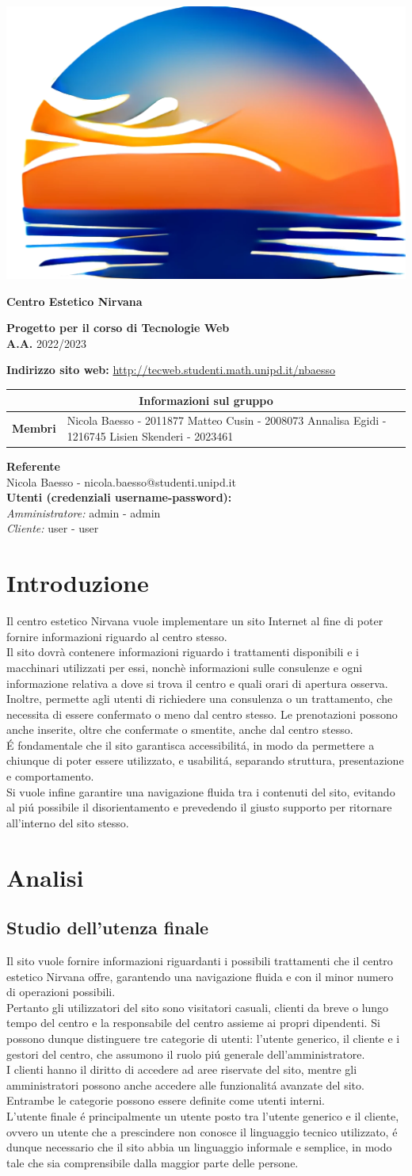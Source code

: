 \documentclass[]{article}
\makeatletter
\newcommand{\copertina}{
	\begin{titlepage}
		\begin{center}
			
			\includegraphics[width=0.4\linewidth]{graphics/icon2.png}\\
			\vspace{1cm}
			
			\begin{Huge}
				\textbf{Centro Estetico Nirvana} \\
			\end{Huge}
			
			\vspace{9pt}  
			
			\begin{large}
				\textbf{Progetto per il corso di Tecnologie Web\\}
				\textbf{A.A.} 2022/2023\\
				\vspace{3pt}
			\end{large}	  
			
			\vspace{24pt}
			
			\begin{large}
				\textbf{Indirizzo sito web:} \href{http://tecweb.studenti.math.unipd.it/nbaesso}{http://tecweb.studenti.math.unipd.it/nbaesso}\\
			\end{large} 
			
			\vspace{10pt} 
			
			\bgroup
			\def\arraystretch{1.3}
			\centering
			\begin{tabular}{r|L{5cm}}
			\multicolumn{2}{c}{\textbf{Informazioni sul gruppo} } \\ \hline
			\textbf{Membri} &  Nicola Baesso - 2011877 \newline Matteo Cusin - 2008073 \newline Annalisa Egidi - 1216745 \newline Lisien Skenderi - 2023461\\
			\end{tabular}
			\egroup
			
			\begin{center}
				\textbf{Referente\\}
				Nicola Baesso - nicola.baesso@studenti.unipd.it\\
				\textbf{Utenti (credenziali username-password):\\}
				\textit{Amministratore:} admin - admin\\
				\textit{Cliente:} user - user\\
			\end{center}
			
		\end{center}
	\end{titlepage}
}	%
\makeatother
\begin{document}
\copertina
\tableofcontents
\newpage
\section{Introduzione}
Il centro estetico Nirvana vuole implementare un sito Internet al fine di poter fornire informazioni riguardo al centro stesso.\\
Il sito dovrà contenere informazioni riguardo i trattamenti disponibili e i macchinari utilizzati per essi, nonchè informazioni sulle consulenze e ogni informazione relativa a dove si trova il centro e quali orari di apertura osserva.\\
Inoltre, permette agli utenti di richiedere una consulenza o un trattamento, che necessita di essere confermato o meno dal centro stesso. Le prenotazioni possono anche inserite, oltre che confermate o smentite, anche dal centro stesso.\\
É fondamentale che il sito garantisca accessibilitá, in modo da permettere a chiunque di poter essere utilizzato, e usabilitá, separando struttura, presentazione e comportamento.\\
Si vuole infine garantire una navigazione fluida tra i contenuti del sito, evitando al piú possibile il disorientamento e prevedendo il giusto supporto per ritornare all'interno del sito stesso.\\
\section{Analisi}
\subsection{Studio dell'utenza finale}
\label{analisi:utenza}
Il sito vuole fornire informazioni riguardanti i possibili trattamenti che il centro estetico Nirvana offre, garantendo una navigazione fluida e con il minor numero di operazioni possibili.\\
Pertanto gli utilizzatori del sito sono visitatori casuali, clienti da breve o lungo tempo del centro e la responsabile del centro assieme ai propri dipendenti.
Si possono dunque distinguere tre categorie di utenti: l'utente generico, il cliente e i gestori del centro, che assumono il ruolo piú generale dell'amministratore.\\
I clienti hanno il diritto di accedere ad aree riservate del sito, mentre gli amministratori possono anche accedere alle funzionalitá avanzate del sito. Entrambe le categorie possono essere definite come utenti interni.\\
L'utente finale é principalmente un utente posto tra l'utente generico e il cliente, ovvero un utente che a prescindere non conosce il linguaggio tecnico utilizzato, é dunque necessario che il sito abbia un linguaggio informale e semplice, in modo tale che sia comprensibile dalla maggior parte delle persone.
\end{document}
